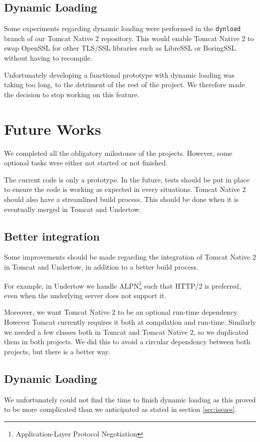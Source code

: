 \documentclass[11pt,a4paper,bibliography=totocnumbered]{scrartcl}
\def\mytitle{Tomcat Native 2}
\begin{document}
\subsection{Dynamic Loading}
Some experiments regarding dynamic loading were performed in the \texttt{dynload} branch of our \mytitle{} repository. This would enable \mytitle{} to swap OpenSSL for other TLS/SSL libraries such as LibreSSL or BoringSSL without having to recompile.

 Unfortunately developing a functional prototype with dynamic loading was taking too long, to the detriment of the rest of the project. We therefore made the decision to stop working on this feature.

\section{Future Works}
We completed all the obligatory milestones of the projects. However, some optional tasks were either not started or not finished.

The current code is only a prototype. In the future, tests should be put in place to ensure the code is working as expected in every situations. \mytitle{} should also have a streamlined build process. This should be done when it is eventually merged in Tomcat and Undertow.

\subsection{Better integration}
Some improvements should be made regarding the integration of \mytitle{} in Tomcat and Undertow, in addition to a better build process.

For example, in Undertow we handle ALPN\footnote{Application-Layer Protocol Negotiation} such that HTTP/2 is preferred, even when the underlying server does not support it.

Moreover, we want \mytitle{} to be an optional run-time dependency. However Tomcat currently requires it both at compilation and run-time. Similarly we needed a few classes both in Tomcat and \mytitle{}, so we duplicated them in both projects. We did this to avoid a circular dependency between both projects, but there is a better way.

\subsection{Dynamic Loading}
We unfortunately could not find the time to finish dynamic loading as this proved to be more complicated than we anticipated as stated in section \ref{sec:issues}.
\end{document}
